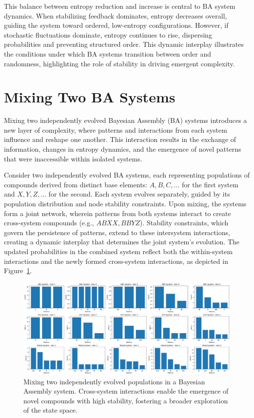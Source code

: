 \documentclass[entropy,article,submit,pdftex,moreauthors]{Definitions/mdpi}
\begin{document}
This balance between entropy reduction and increase is central to BA system dynamics. When stabilizing feedback dominates, entropy decreases overall, guiding the system toward ordered, low-entropy configurations. However, if stochastic fluctuations dominate, entropy continues to rise, dispersing probabilities and preventing structured order. This dynamic interplay illustrates the conditions under which BA systems transition between order and randomness, highlighting the role of stability in driving emergent complexity.

\section{Mixing Two BA Systems}

Mixing two independently evolved Bayesian Assembly (BA) systems introduces a new layer of complexity, where patterns and interactions from each system influence and reshape one another. This interaction results in the exchange of information, changes in entropy dynamics, and the emergence of novel patterns that were inaccessible within isolated systems.

Consider two independently evolved BA systems, each representing populations of compounds derived from distinct base elements: \( A, B, C, \dots \) for the first system and \( X, Y, Z, \dots \) for the second. Each system evolves separately, guided by its population distribution and node stability constraints. Upon mixing, the systems form a joint network, wherein patterns from both systems interact to create cross-system compounds (e.g., \( ABXX, BBYZ \)). Stability constraints, which govern the persistence of patterns, extend to these intersystem interactions, creating a dynamic interplay that determines the joint system's evolution. The updated probabilities in the combined system reflect both the within-system interactions and the newly formed cross-system interactions, as depicted in Figure~\ref{fig:mixed_1}.

\begin{figure}[htp]
    \centering
    \includegraphics[width=13cm]{mixed_1}
    \caption{Mixing two independently evolved populations in a Bayesian Assembly system. Cross-system interactions enable the emergence of novel compounds with high stability, fostering a broader exploration of the state space.}
    \label{fig:mixed_1}
\end{figure}
\end{document}
